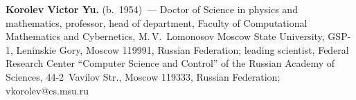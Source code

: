 \vspace*{3pt}

\noindent
\textbf{Korolev Victor Yu.} (b.\ 1954)~--- Doctor of Science in 
physics and
mathematics, professor, head of department, Faculty of Computational 
Mathematics and Cybernetics, M.\,V.~Lomonosov Moscow State University, 
GSP-1, Leninskie Gory, Moscow 119991, Russian Federation; leading 
scientist, Federal Research Center ``Computer Science and Control'' of 
the Russian Academy of Sciences, 44-2~Vavilov Str., Moscow 119333, 
Russian Federation; \mbox{vkorolev@cs.msu.ru}


\label{end\stat}

\renewcommand{\bibname}{\protect\rm Литература} 